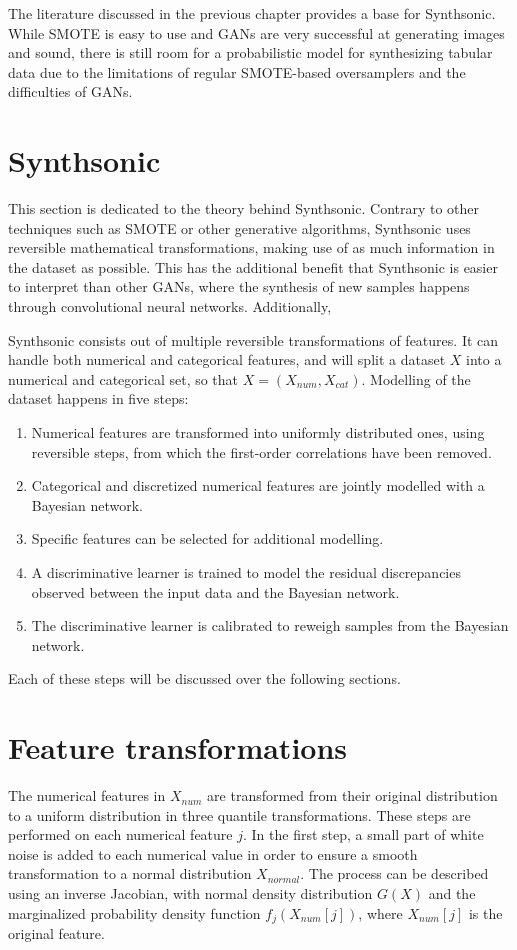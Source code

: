 The literature discussed in the previous chapter provides a base for Synthsonic. While SMOTE is easy to use and GANs are very successful at generating images and sound, there is still room for a probabilistic model for synthesizing tabular data due to the limitations of regular SMOTE-based oversamplers and the difficulties of GANs.

\section{Synthsonic}
This section is dedicated to the theory behind Synthsonic. Contrary to other techniques such as SMOTE or other generative algorithms, Synthsonic uses reversible mathematical transformations, making use of as much information in the dataset as possible. This has the additional benefit that Synthsonic is easier to interpret than other GANs, where the synthesis of new samples happens through convolutional neural networks. Additionally, 


Synthsonic consists out of multiple reversible transformations of features. It can handle both numerical and categorical features, and will split a dataset $X$ into a numerical and categorical set, so that $X = (X_{num}, X_{cat})$. Modelling of the dataset happens in five steps:

\begin{enumerate}
    \item Numerical features are transformed into uniformly distributed ones, using reversible steps, from which the first-order correlations have been removed.
    \item Categorical and discretized numerical features are jointly modelled with a Bayesian network.
    \item Specific features can be selected for additional modelling.
    \item A discriminative learner is trained to model the residual discrepancies observed between the input data and the Bayesian network.
    \item The discriminative learner is calibrated to reweigh samples from the Bayesian network.
\end{enumerate}

Each of these steps will be discussed over the following sections.

\section{Feature transformations}
\label{sec:Feat_trans}
The numerical features in $X_{num}$ are transformed from their original distribution to a uniform distribution in three quantile transformations. These steps are performed on each numerical feature $j$. In the first step, a small part of white noise is added to each numerical value in order to ensure a smooth transformation to a normal distribution $X_{normal}$. The process can be described using an inverse Jacobian, with normal density distribution $G(X)$ and the marginalized probability density function $f_j(X_{num}[j])$, where $X_{num}[j]$ is the original feature. 

